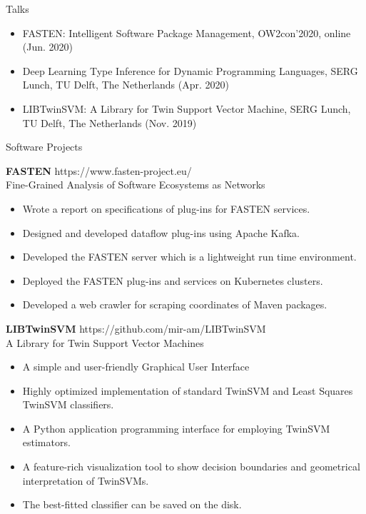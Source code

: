 \documentclass{resume} %
\begin{document}
\begin{rSection}{Talks}
\begin{itemize}
	\item FASTEN: Intelligent Software Package Management, OW2con'2020, online (Jun. 2020)
	\item Deep Learning Type Inference for Dynamic Programming Languages, SERG Lunch, TU Delft, The Netherlands (Apr. 2020)
	\item LIBTwinSVM: A Library for Twin Support Vector Machine, SERG Lunch, TU Delft, The Netherlands (Nov. 2019)
\end{itemize}
\end{rSection}

\begin{rSection}{Software Projects}
	
	{\bf FASTEN} \hfill {https://www.fasten-project.eu/} \\ 
	Fine-Grained Analysis of Software Ecosystems as Networks \\
	
	
    \begin{itemize}
		\item Wrote a report on specifications of plug-ins for FASTEN services.
		\item Designed and developed dataflow plug-ins using Apache Kafka.
		\item Developed the FASTEN server which is a lightweight run time environment.
		\item Deployed the FASTEN plug-ins and services on Kubernetes clusters.
		\item Developed a web crawler for scraping coordinates of Maven packages.
	\end{itemize}
	
	\newpage
	{\bf LIBTwinSVM} \hfill {https://github.com/mir-am/LIBTwinSVM} \\ 
	A Library for Twin Support Vector Machines \\
	
	\begin{itemize}
		\item A simple and user-friendly Graphical User Interface
		\item Highly optimized implementation of standard TwinSVM and Least Squares TwinSVM classifiers.
		\item A Python application programming interface for employing TwinSVM estimators.
		\item A feature-rich visualization tool to show decision boundaries and geometrical interpretation of TwinSVMs.
		\item The best-fitted classifier can be saved on the disk.
	\end{itemize}
	

\end{rSection}
\end{document}
